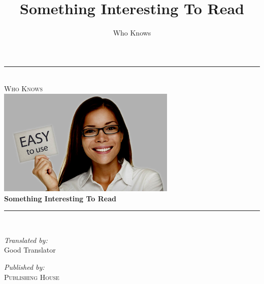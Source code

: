 \documentclass[10pt,oneside]{article} %
\author{Who Knows}
\title{Something Interesting To Read}
\begin{document}
\newcommand{\HRule}{\rule{\linewidth}{0.5mm}}
\begin{titlepage}
\begin{center}

\HRule \\[0.3cm]
\textsc{\Large Who Knows} \\[0.3cm]
\includegraphics[width=8.5cm]{img/coverimg.jpg} \\[0.3cm]
{ \Huge \bfseries Something Interesting To Read} \\%
\HRule \\[0.3cm]

\begin{minipage}{0.4\textwidth}
\begin{flushleft} \small
\emph{Translated by:}\\
Good Translator %
\end{flushleft}
\end{minipage}
\begin{minipage}{0.4\textwidth}
\begin{flushright} \small
\emph{Published by:} \\
\textsc{Publishing House} %
\end{flushright}
\end{minipage}

\end{center}
\end{titlepage}




\tableofcontents




\end{document}

